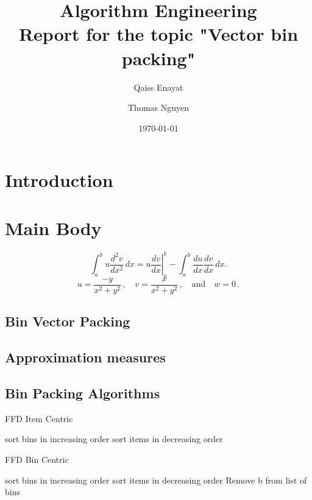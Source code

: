 \documentclass[a4paper,11pt,titlepage]{article}
\begin{document}
\begin{titlepage}
    \title{Algorithm Engineering\\Report for the topic "Vector bin packing"}
    \author{Qaiss Enayat \and Thomas Nguyen}
    \date{\today}
\end{titlepage}
\maketitle
\tableofcontents
\pagebreak
\section{Introduction}
\cite{heuristicsvbp}
\lipsum[1-5]
\section{Main Body}
\lipsum[5-7]
\[
\int_a^bu\frac{d^2v}{dx^2}\,dx
=\left.u\frac{dv}{dx}\right|_a^b
-\int_a^b\frac{du}{dx}\frac{dv}{dx}\,dx.
\]
\lipsum[8]
\[
u=\frac{-y}{x^2+y^2}\,,\quad
v=\frac{x}{x^2+y^2}\,,\quad\text{and}\quad
w=0\,.
\]
\lipsum[1-3]

\subsection{Bin Vector Packing}
\subsection{Approximation measures}
\subsection{Bin Packing Algorithms}
\begin{algorithm}

	\caption{FFD Item Centric}\label{alg:two}
	
	sort bins in increasing order\;
	sort items in decreasing order\;
	
	
\end{algorithm}
	
\begin{algorithm}
	
	\caption{FFD Bin Centric}\label{alg:two}
	
	sort bins in increasing order\;
	sort items in decreasing order\;
		Remove b from list of bins\;
		
	
	
\end{algorithm}	
\end{document}
